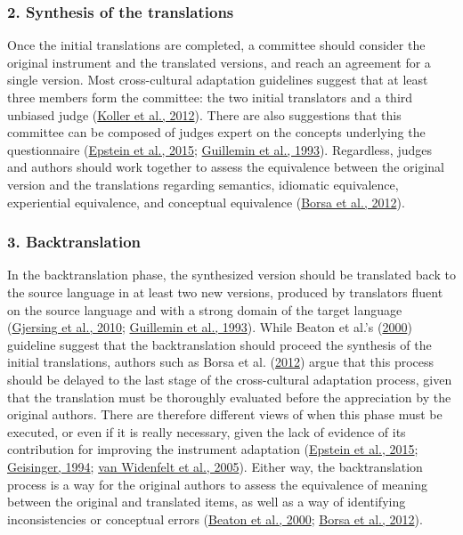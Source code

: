 \documentclass[
  ,doc,11pt, twoside,floatsintext]{apa6}
\begin{document}
\hypertarget{synthesis-of-the-translations}{%
\subsubsection{2. Synthesis of the translations}\label{synthesis-of-the-translations}}

Once the initial translations are completed, a committee should consider the original instrument and the translated versions, and reach an agreement for a single version. Most cross-cultural adaptation guidelines suggest that at least three members form the committee: the two initial translators and a third unbiased judge (\protect\hyperlink{ref-koller2012}{Koller et al., 2012}). There are also suggestions that this committee can be composed of judges expert on the concepts underlying the questionnaire (\protect\hyperlink{ref-epstein2015}{Epstein et al., 2015}; \protect\hyperlink{ref-guillemin1993}{Guillemin et al., 1993}). Regardless, judges and authors should work together to assess the equivalence between the original version and the translations regarding semantics, idiomatic equivalence, experiential equivalence, and conceptual equivalence (\protect\hyperlink{ref-borsaAdaptacaoValidacaoInstrumentos2012}{Borsa et al., 2012}).

\hypertarget{backtranslation}{%
\subsubsection{3. Backtranslation}\label{backtranslation}}

In the backtranslation phase, the synthesized version should be translated back to the source language in at least two new versions, produced by translators fluent on the source language and with a strong domain of the target language (\protect\hyperlink{ref-gjersing2010}{Gjersing et al., 2010}; \protect\hyperlink{ref-guillemin1993}{Guillemin et al., 1993}). While Beaton et al.'s (\protect\hyperlink{ref-beaton2000}{2000}) guideline suggest that the backtranslation should proceed the synthesis of the initial translations, authors such as Borsa et al. (\protect\hyperlink{ref-borsaAdaptacaoValidacaoInstrumentos2012}{2012}) argue that this process should be delayed to the last stage of the cross-cultural adaptation process, given that the translation must be thoroughly evaluated before the appreciation by the original authors. There are therefore different views of when this phase must be executed, or even if it is really necessary, given the lack of evidence of its contribution for improving the instrument adaptation (\protect\hyperlink{ref-epstein2015}{Epstein et al., 2015}; \protect\hyperlink{ref-geisinger1994}{Geisinger, 1994}; \protect\hyperlink{ref-vanwidenfelt2005}{van Widenfelt et al., 2005}). Either way, the backtranslation process is a way for the original authors to assess the equivalence of meaning between the original and translated items, as well as a way of identifying inconsistencies or conceptual errors (\protect\hyperlink{ref-beaton2000}{Beaton et al., 2000}; \protect\hyperlink{ref-borsaAdaptacaoValidacaoInstrumentos2012}{Borsa et al., 2012}).
\end{document}
